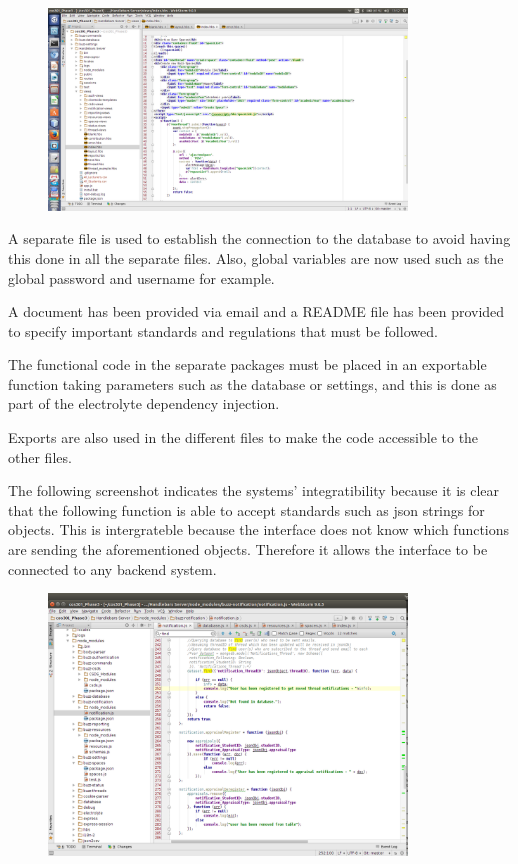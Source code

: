 \documentclass[hidelinks, 12pt, oneside]{article}
\begin{document}
\begin{enumerate}
\begin{figure}[h!]
  \centering
    \includegraphics[width=0.85\textwidth]{HbsFiles} 
\end{figure}

A separate file is used to establish the connection to the database to avoid having this done in all the separate files. Also, global variables are now used such as the global password and username for example. 

A document has been provided via email and a README file has been provided to specify important standards and regulations that must be followed.

The functional code in the separate packages must be placed in an exportable function taking parameters such as the database or settings, and this is done as part of the electrolyte dependency injection. 

Exports are also used in the different files to make the code accessible to the other files.

The following screenshot indicates the systems' integratibility because it is clear that the following function is able to accept standards such as json strings for objects. This is intergrateble because the interface does not know which functions are sending the aforementioned objects. Therefore it allows the interface to be connected to any backend system.

\begin{figure}[h!]
  \centering
    \includegraphics[width=0.85\textwidth]{JsonObject} 
\end{figure}



\end{enumerate}
\end{document}
